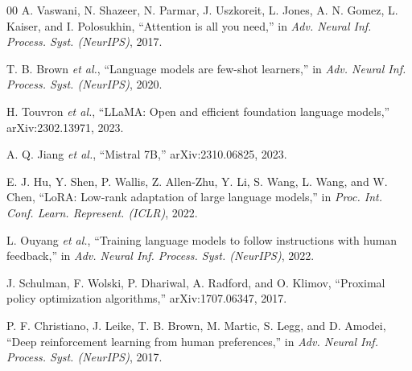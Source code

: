 \documentclass[conference]{IEEEtran}
\begin{document}
\begin{thebibliography}{00}
 A. Vaswani, N. Shazeer, N. Parmar, J. Uszkoreit, L. Jones, A. N. Gomez, L. Kaiser, and I. Polosukhin, ``Attention is all you need,'' in \emph{Adv. Neural Inf. Process. Syst. (NeurIPS)}, 2017.

 T. B. Brown \emph{et al.}, ``Language models are few-shot learners,'' in \emph{Adv. Neural Inf. Process. Syst. (NeurIPS)}, 2020.

 H. Touvron \emph{et al.}, ``LLaMA: Open and efficient foundation language models,'' arXiv:2302.13971, 2023.

 A. Q. Jiang \emph{et al.}, ``Mistral 7B,'' arXiv:2310.06825, 2023.

 E. J. Hu, Y. Shen, P. Wallis, Z. Allen-Zhu, Y. Li, S. Wang, L. Wang, and W. Chen, ``LoRA: Low-rank adaptation of large language models,'' in \emph{Proc. Int. Conf. Learn. Represent. (ICLR)}, 2022.

 L. Ouyang \emph{et al.}, ``Training language models to follow instructions with human feedback,'' in \emph{Adv. Neural Inf. Process. Syst. (NeurIPS)}, 2022.

 J. Schulman, F. Wolski, P. Dhariwal, A. Radford, and O. Klimov, ``Proximal policy optimization algorithms,'' arXiv:1707.06347, 2017.

 P. F. Christiano, J. Leike, T. B. Brown, M. Martic, S. Legg, and D. Amodei, ``Deep reinforcement learning from human preferences,'' in \emph{Adv. Neural Inf. Process. Syst. (NeurIPS)}, 2017.

\end{thebibliography}
\end{document}
